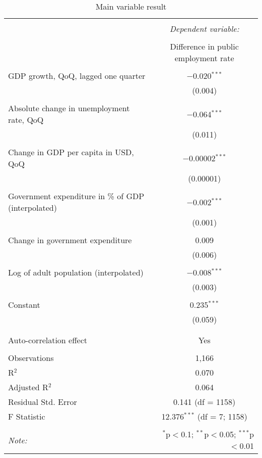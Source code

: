 
\begin{table}[!htbp] \centering 
  \caption{Main variable result} 
  \label{} 
\begin{tabular}{@{\extracolsep{5pt}}lc} 
\\[-1.8ex]\hline 
\hline \\[-1.8ex] 
 & \multicolumn{1}{c}{\textit{Dependent variable:}} \\ 
\cline{2-2} 
\\[-1.8ex] & Difference in public employment rate \\ 
\hline \\[-1.8ex] 
 GDP growth, QoQ, lagged one quarter & $-$0.020$^{***}$ \\ 
  & (0.004) \\ 
  & \\ 
 Absolute change in unemployment rate, QoQ & $-$0.064$^{***}$ \\ 
  & (0.011) \\ 
  & \\ 
 Change in GDP per capita in USD, QoQ & $-$0.00002$^{***}$ \\ 
  & (0.00001) \\ 
  & \\ 
 Government expenditure in \% of GDP (interpolated) & $-$0.002$^{***}$ \\ 
  & (0.001) \\ 
  & \\ 
 Change in government expenditure & 0.009 \\ 
  & (0.006) \\ 
  & \\ 
 Log of adult population (interpolated) & $-$0.008$^{***}$ \\ 
  & (0.003) \\ 
  & \\ 
 Constant & 0.235$^{***}$ \\ 
  & (0.059) \\ 
  & \\ 
\hline \\[-1.8ex] 
Auto-correlation effect & Yes \\ 
\hline \\[-1.8ex] 
Observations & 1,166 \\ 
R$^{2}$ & 0.070 \\ 
Adjusted R$^{2}$ & 0.064 \\ 
Residual Std. Error & 0.141 (df = 1158) \\ 
F Statistic & 12.376$^{***}$ (df = 7; 1158) \\ 
\hline 
\hline \\[-1.8ex] 
\textit{Note:}  & \multicolumn{1}{r}{$^{*}$p$<$0.1; $^{**}$p$<$0.05; $^{***}$p$<$0.01} \\ 
\end{tabular} 
\end{table} 
